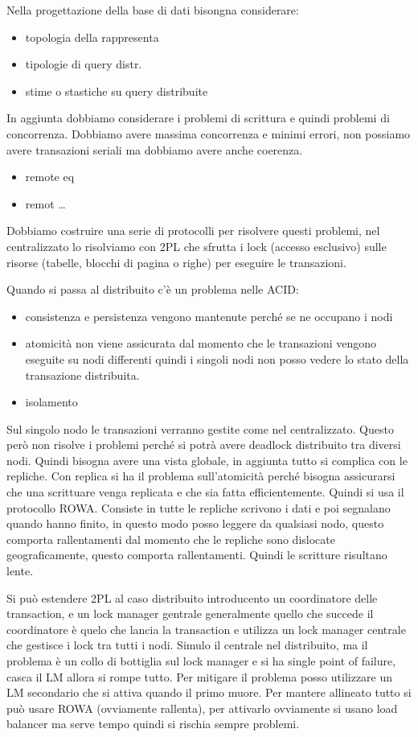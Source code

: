 Nella progettazione della base di dati bisongna considerare:
\begin{itemize}
      \item topologia della rappresenta
      \item tipologie di query distr.
      \item stime o stastiche su query distribuite
\end{itemize}

In aggiunta dobbiamo considerare i problemi di scrittura e quindi problemi di 
concorrenza. Dobbiamo avere massima concorrenza e minimi errori, non possiamo avere
transazioni seriali ma dobbiamo avere anche coerenza.
\begin{itemize}
      \item remote eq
      \item remot \dots
\end{itemize}

Dobbiamo costruire una serie di protocolli per risolvere questi problemi, 
nel centralizzato lo risolviamo con 2PL che sfrutta i lock (accesso esclusivo)
sulle risorse (tabelle, blocchi di pagina o righe) per eseguire le transazioni.

Quando si passa al distribuito c'è un problema nelle ACID:
\begin{itemize}
      \item consistenza e persistenza vengono mantenute perché se ne occupano i nodi
      \item atomicità  non viene assicurata dal momento che le transazioni vengono
      eseguite su nodi differenti quindi i singoli nodi non posso vedere lo stato
      della transazione distribuita.
      \item isolamento
\end{itemize}
Sul singolo nodo le transazioni verranno gestite come nel centralizzato. Questo 
però non risolve i problemi perché si potrà avere deadlock distribuito tra diversi 
nodi. Quindi bisogna avere una vista globale, in aggiunta tutto si complica con 
le repliche.
Con replica si ha il problema sull'atomicità perché bisogna assicurarsi che una 
scrittuare venga replicata e che sia fatta efficientemente. Quindi si usa il protocollo
ROWA. Consiste in tutte le repliche scrivono i dati e poi segnalano quando hanno finito,
in questo modo posso leggere da qualsiasi nodo, questo comporta rallentamenti dal 
momento che le repliche sono dislocate geograficamente, questo comporta rallentamenti.
Quindi le scritture risultano lente.


Si può estendere 2PL al caso distribuito introducento un coordinatore delle transaction, e
un lock manager gentrale generalmente quello che succede il coordinatore è quelo che 
lancia la transaction e utilizza un lock manager centrale che gestisce i lock tra 
tutti i nodi. Simulo il centrale nel distribuito, ma il problema è un collo di bottiglia
sul lock manager e si ha single point of failure, casca il LM allora si rompe tutto.
Per mitigare il problema posso utilizzare un LM secondario che si attiva quando 
il primo muore. Per mantere allineato tutto si può usare ROWA (ovviamente rallenta),
per attivarlo ovviamente si usano load balancer ma serve tempo quindi si rischia
sempre problemi. 

